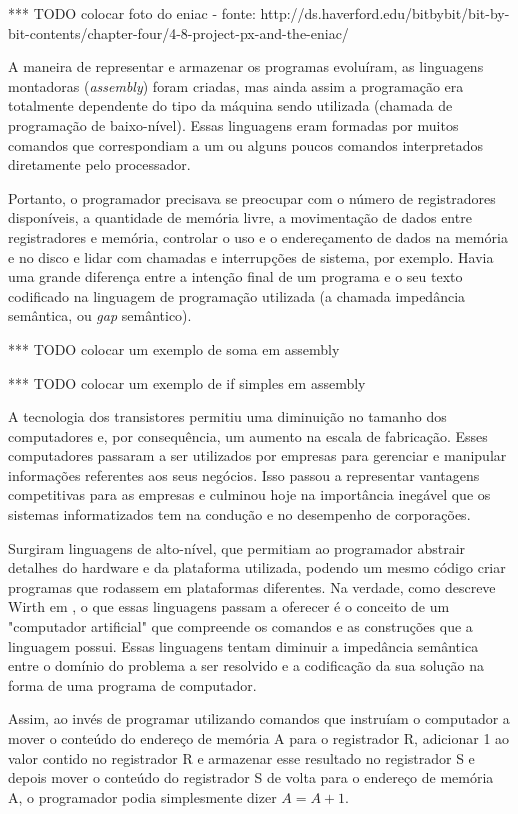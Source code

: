 \documentclass[11pt,twoside,a4paper]{book}
\begin{document}
*** TODO colocar foto do eniac - fonte: http://ds.haverford.edu/bitbybit/bit-by-bit-contents/chapter-four/4-8-project-px-and-the-eniac/

A maneira de representar e armazenar os programas evoluíram, as linguagens montadoras (\emph{assembly}) foram criadas, mas ainda assim a programação era totalmente dependente do tipo da máquina sendo utilizada (chamada de programação de baixo-nível). Essas linguagens eram formadas por muitos comandos que correspondiam a um ou alguns poucos comandos interpretados diretamente pelo processador. 

Portanto, o programador precisava se preocupar com o número de registradores disponíveis, a quantidade de memória livre, a movimentação de dados entre registradores e memória, controlar o uso e o endereçamento de dados na memória e no disco e lidar com chamadas e interrupções de sistema, por exemplo. Havia uma grande diferença entre a intenção final de um programa e o seu texto codificado na linguagem de programação utilizada (a chamada impedância semântica, ou \emph{gap} semântico).

*** TODO colocar um exemplo de soma em assembly

*** TODO colocar um exemplo de if simples em assembly

A tecnologia dos transistores permitiu uma diminuição no tamanho dos computadores e, por consequência, um aumento na escala de fabricação. Esses computadores passaram a ser utilizados por empresas para gerenciar e manipular informações referentes aos seus negócios. Isso passou a representar vantagens competitivas para as empresas e culminou hoje na importância inegável que os sistemas informatizados tem na condução e no desempenho de corporações.

Surgiram linguagens de alto-nível, que permitiam ao programador abstrair detalhes do hardware e da plataforma utilizada, podendo um mesmo código criar programas que rodassem em plataformas diferentes. Na verdade, como descreve Wirth em \cite{alg_ds}, o que essas linguagens passam a oferecer é o conceito de um "computador artificial" que compreende os comandos e as construções que a linguagem possui. Essas linguagens tentam diminuir a impedância semântica entre o domínio do problema a ser resolvido e a codificação da sua solução na forma de uma programa de computador.

Assim, ao invés de programar utilizando comandos que instruíam o computador a mover o conteúdo do endereço de memória A para o registrador R, adicionar 1 ao valor contido no registrador R e armazenar esse resultado no registrador S e depois mover o conteúdo do registrador S de volta para o endereço de memória A, o programador podia simplesmente dizer $A = A + 1$.
\end{document}
